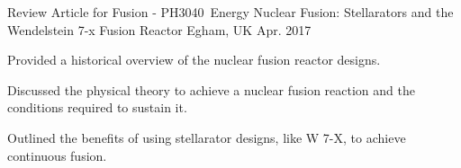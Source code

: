 \begin{cventries}
	
	\cventry
	{Review Article for Fusion -  PH3040~Energy}
	{Nuclear Fusion: Stellarators and the Wendelstein 7-x Fusion Reactor}
	{Egham, UK}
	{Apr. 2017}
	{
		\begin{cvitems}
			\item {Provided a historical overview of the nuclear fusion reactor designs.}
			\item {Discussed the physical theory to achieve a nuclear fusion reaction and the conditions required to sustain it.}
			\item {Outlined the benefits of using stellarator designs, like W 7-X, to achieve continuous fusion.}
		\end{cvitems}
	}


\end{cventries}
